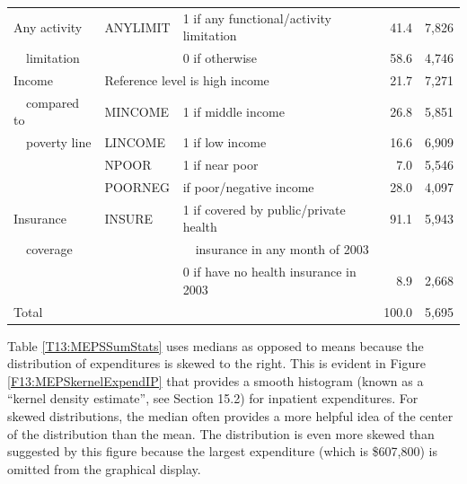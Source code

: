 \begin{table}[h]
\begin{center}
\begin{tabular}{lllrr}
Any activity & ANYLIMIT & 1 if any functional/activity limitation&
41.4 & 7,826  \\
\ \ limitation &  & 0 if otherwise & 58.6 & 4,746
\\ \hline Income &  \multicolumn{2}{l}{Reference level is high income} & 21.7 &  7,271 \\
\ \ compared to & MINCOME & 1 if middle income & 26.8 &  5,851 \\
\ \ poverty line & LINCOME & 1 if low income & 16.6 & 6,909  \\
& NPOOR & 1 if near poor & 7.0 & 5,546
\\
& POORNEG & if poor/negative income & 28.0 & 4,097
\\ \hline Insurance & INSURE & 1 if covered by public/private health
&91.1 &  5,943 \\
\ \ coverage &  & \ \ insurance in any month of 2003 &  &
 \\
&  & 0 if have no health insurance in 2003 & 8.9 & 2,668
\\ \hline
Total &  &  & 100.0 & 5,695 \\ \hline
\end{tabular}
\end{center}\end{table}

\bigskip


Table \ref{T13:MEPSSumStats} uses medians as opposed to means
because the distribution of expenditures is skewed to the right.
This is evident in Figure \ref{F13:MEPSkernelExpendIP} that provides
a smooth histogram (known as a ``kernel density estimate'', see
Section 15.2) for inpatient expenditures. For skewed distributions,
the median often provides a more helpful idea of the center of the
distribution than the mean. The distribution is even more skewed
than suggested by this figure because the largest expenditure (which
is \$607,800) is omitted from the graphical display.

